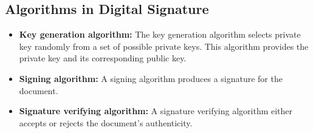 \subsection{Algorithms in Digital Signature}
\begin{itemize}[parsep=0.5em]
   \item \textbf{Key generation algorithm:} The key generation algorithm selects private key randomly from a set of possible private keys. This algorithm provides the private key and its corresponding public key.
   \item \textbf{Signing algorithm:} A signing algorithm produces a signature for the document.
   \item \textbf{Signature verifying algorithm:} A signature verifying algorithm either accepts or rejects the document's authenticity.
\end{itemize}
